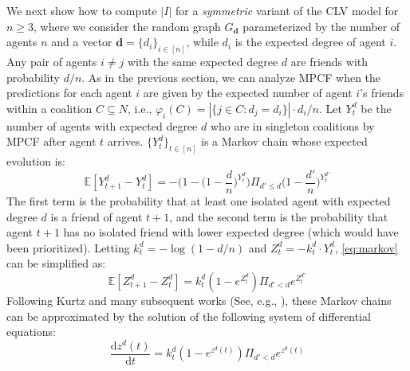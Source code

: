 \documentclass[letterpaper]{article}
\begin{document}
We next show how to compute $|I|$ for a \textit{symmetric} variant of the CLV model for $n \geq 3$, where we consider the random graph $G_{\mathbf{d}}$ parameterized by the number of agents $n$ and a vector $\mathbf{d} = \{d_i\}_{i\in [n]}$, while $d_i$ is the expected degree of agent $i$. Any pair of agents $i\neq j$ with the same expected degree $d$ are friends with probability $d / n$. As in the previous section, we can analyze MPCF when the predictions for each agent $i$ are given by the expected number of agent $i$'s friends within a coalition $C \subseteq N$, i.e., $\varphi_i(C) = |\{j \in C: d_j = d_i\}| \cdot d_i /n$. %
Let $Y_t^d$ be the number of agents with expected degree $d$ who are in singleton coalitions by MPCF after agent $t$ arrives. %
$\{Y_t^d\}_{t\in [n]}$ is a Markov chain whose expected evolution is:
\begin{equation}
\label{eq:markov}
\mathbb{E}[Y_{t+1}^d-Y_t^d] = -\Big(1-\Big(1- \frac{d}{n}\Big)^{Y_t^d}\Big) \Pi_{d' \leq d} \Big(1- \frac{{d'}}{n}\Big)^{Y_t^{d'}}
\end{equation}
The first term is the probability that at least one isolated agent with expected degree $d$ is a friend of agent $t+1$, and the second term is the probability that agent $t+1$ has no isolated friend with lower expected degree (which would have been prioritized). Letting $k_t^d = -\log(1- d / n)$ and $Z_t^d = -k_t^d \cdot Y_{t}^d$, \eqref{eq:markov} can be simplified as:
\begin{equation}
\label{eq:markov2}
\mathbb{E}[Z_{t+1}^d-Z_t^d] = k_t^d (1- e^{Z_t^d}) \Pi_{d' < d} e^{Z_t^{d'}}
\end{equation}
Following Kurtz \cite{kurtz1971limit} and many subsequent works (See, e.g., \cite{aamand2022optimal}), these Markov chains can be approximated by the solution of the following system of differential equations:
\begin{equation}
\label{eq:diff}
\frac{\mathrm{d} z^d(t)}{\mathrm{d} t} =  k_t^d (1- e^{z^d(t)}) \Pi_{d' < d} e^{z^d(t)}
\end{equation}
\end{document}
